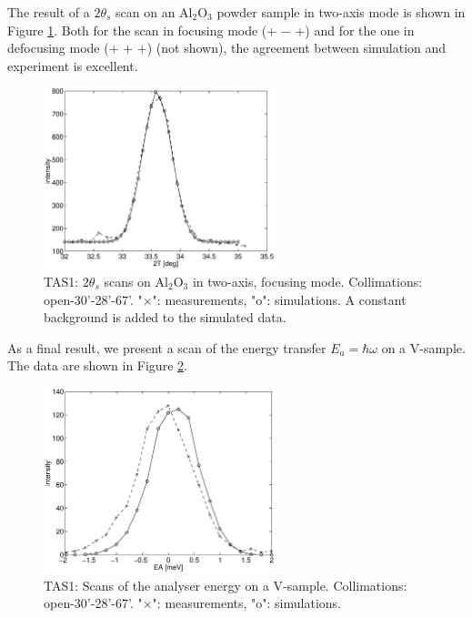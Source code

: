 The result of a $2\theta_s$ scan on an Al$_2$O$_3$
powder sample in two-axis mode is shown in Figure \ref{f:al2o3}.
Both for the scan in focusing mode (+ $-$ +)
and for the one in defocusing mode (+ + +) (not shown),
the agreement between simulation and experiment is excellent.

\begin{figure}
  \begin{center}
    \includegraphics[width=0.6\textwidth]{figures/al2o3-focus.eps}
  \end{center}
\caption{TAS1: $2\theta_s$ scans on Al$_2$O$_3$ in two-axis, focusing mode.
Collimations: open-30'-28'-67'.
"$\times$": measurements, "o": simulations.  
A constant background is added to the simulated data.}
\label{f:al2o3}
\end{figure}

As a final result, we present a scan of the energy
transfer $E_a = \hbar \omega$ on a V-sample.
The data are shown in Figure \ref{f:v_ea}.

\begin{figure}
  \begin{center}
    \includegraphics[width=0.6\textwidth]{figures/ea-scan.eps}
  \end{center}
\caption{TAS1: Scans of the analyser energy on a V-sample.
Collimations: open-30'-28'-67'.
"$\times$": measurements, "o": simulations.}
\label{f:v_ea}
\end{figure}


